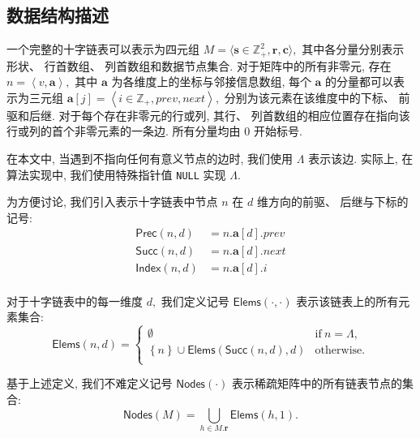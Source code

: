 \subsection{数据结构描述}

一个完整的十字链表可以表示为四元组 $M = \langle \bm{s} \in \mathbb{Z}_{+}^{2}, \bm{r}, \bm{c} \rangle,$ 其中各分量分别表示形状、 行首数组、 列首数组和数据节点集合. 对于矩阵中的所有非零元, 存在 $n = \left\langle v, \bm{a} \right\rangle,$ 其中 $\bm{a}$ 为各维度上的坐标与邻接信息数组, 每个 $\bm{a}$ 的分量都可以表示为三元组 $\bm{a}[j] = \left\langle i \in \mathbb{Z}_+, prev, next\right\rangle,$ 分别为该元素在该维度中的下标、 前驱和后继. 对于每个存在非零元的行或列, 其行、 列首数组的相应位置存在指向该行或列的首个非零元素的一条边. 所有分量均由 0 开始标号.

在本文中, 当遇到不指向任何有意义节点的边时, 我们使用 $\Lambda$ 表示该边. 实际上, 在算法实现中, 我们使用特殊指针值 \texttt{NULL} 实现 $\Lambda.$

\newcommand{\Prec}[2]{\mathsf{Prec}(#1, #2)}
\newcommand{\Succ}[2]{\mathsf{Succ}(#1, #2)}
\newcommand{\Index}[2]{\mathsf{Index}(#1, #2)}
为方便讨论, 我们引入表示十字链表中节点 $n$ 在 $d$ 维方向的前驱、 后继与下标的记号:
\begin{equation}
    \begin{aligned}
        \Prec{n}{d} & = n.\bm{a}[d].prev\\
        \Succ{n}{d} & = n.\bm{a}[d].next\\
        \Index{n}{d} & = n.\bm{a}[d].i\\
    \end{aligned}
\end{equation}

\newcommand{\Elems}[2]{\mathsf{Elems}(#1, #2)}
对于十字链表中的每一维度 $d,$ 我们定义记号 $\Elems{\cdot}{\cdot}$ 表示该链表上的所有元素集合:
\begin{equation}
    \Elems{n}{d} = \begin{cases}
        \emptyset & \text{if}\ n = \Lambda,\\
        \left\{n\right\} \cup \Elems{\Succ{n}{d}}{d} & \text{otherwise}.\\
    \end{cases}
\end{equation}

\newcommand{\Nodes}[1]{\mathsf{Nodes}(#1)}
基于上述定义, 我们不难定义记号 $\Nodes{\cdot}$ 表示稀疏矩阵中的所有链表节点的集合:
\begin{equation}
    \Nodes{M} = \bigcup_{h \in M.\bm{r}} \Elems{h}{1}.
\end{equation}

